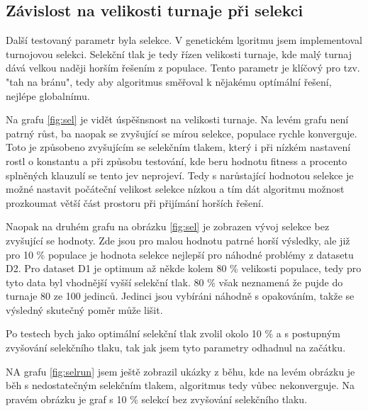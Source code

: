 \documentclass[11pt]{article}
\begin{document}
\subsection{Závislost na velikosti turnaje při selekci}
Další testovaný parametr byla selekce. V genetickém lgoritmu jsem implementoval turnojovou selekci. Selekční tlak je tedy řízen velikosti turnaje, kde malý turnaj dává velkou naději horším řešením z populace. Tento parametr je klíčový pro tzv. "tah na bránu", tedy aby algoritmus směřoval k nějakému optímální řešení, nejlépe globalnímu. 

Na grafu \ref{fig:sel} je vidět úspěšnsnost na velikosti turnaje. Na levém grafu není patrný růst, ba naopak se zvyšující se mírou selekce, populace rychle konverguje. Toto je způsobeno zvyšujícím se selekčním tlakem, který i při nízkém nastavení rostl o konstantu a při způsobu testování, kde beru hodnotu fitness a procento splněných klauzulí se tento jev neprojeví. Tedy s narůstající hodnotou selekce je možné nastavit počáteční velikost selekce nízkou a tím dát algoritmu možnost prozkoumat větší část prostoru při přijímání horších řešení. 

Naopak na druhém grafu na obrázku \ref{fig:sel} je zobrazen vývoj selekce bez zvyšující se hodnoty. Zde jsou pro malou hodnotu patrné   horší výsledky, ale již pro 10 \% populace je hodnota selekce nejlepší pro náhodné problémy z datasetu D2. Pro dataset D1 je optimum až někde kolem 80 \% velikosti populace, tedy pro tyto data byl vhodnější vyšší selekční tlak. 80 \% však neznamená že pujde do turnaje 80 ze 100 jedinců. Jedinci jsou vybíráni náhodně s opakováním, takže se výsledný skutečný poměr může lišit.

Po testech bych jako optimální selekční tlak zvolil okolo 10 \% a s postupným zvyšování selekčního tlaku, tak jak jsem tyto parametry odhadnul na začátku. 

NA grafu \ref{fig:selrun} jsem ještě zobrazil ukázky z běhu, kde na levém obrázku je běh s nedostatečným selekčním tlakem, algoritmus tedy vůbec nekonverguje. Na pravém obrázku je graf s 10 \% selekcí bez zvyšování selekčního tlaku. 
\end{document}
